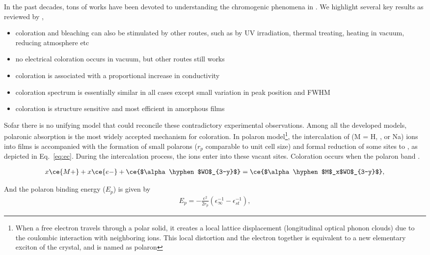 In the past decades, tons of works have been devoted to understanding the chromogenic phenomena in . We highlight several key results as reviewed by ,
\begin{itemize}
    \item coloration and bleaching can also be stimulated by other routes, such as by UV irradiation, thermal treating, heating in vacuum, reducing atmosphere etc
    \item no electrical coloration occurs in vacuum, but other routes still works
    \item coloration is associated with a proportional increase in conductivity
    \item coloration spectrum is essentially similar in all cases except small variation in peak position and FWHM
    \item coloration is structure sensitive and most efficient in amorphous films
\end{itemize}

Sofar there is no unifying model that could reconcile these contradictory experimental observations. Among all the developed models, polaronic absorption is the most widely accepted mechanism for coloration. In polaron model\footnote{When a free electron travels through a polar solid, it creates a local lattice displacement (longitudinal optical phonon clouds) due to the coulombic interaction with neighboring ions. This local distortion and the electron together is equivalent to a new elementary exciton of the crystal, and is named as polaron}, the intercalation of  (M = H, , or Na) ions into  films is accompanied with the formation of small polarons ($r_p$ comparable to unit cell size) and formal reduction of some  sites to , as depicted in Eq.~\ref{eq:ec}. During the intercalation process, the  ions enter into these vacant sites.\cite{Hepel2008} Coloration occurs when the polaron band .

\begin{align}\label{eq:ec}
x\ce{M+} + x\ce{e-} +  \ce{$\alpha \hyphen$WO$_{3-y}$}= \ce{$\alpha \hyphen$M$_x$WO$_{3-y}$},
\end{align}

And the polaron binding energy ($E_p$) is given by
\begin{align}
E_p = - \frac{e^2}{2r_p} (\epsilon_\infty^{-1} - \epsilon_{st}^{-1}),
\end{align}

